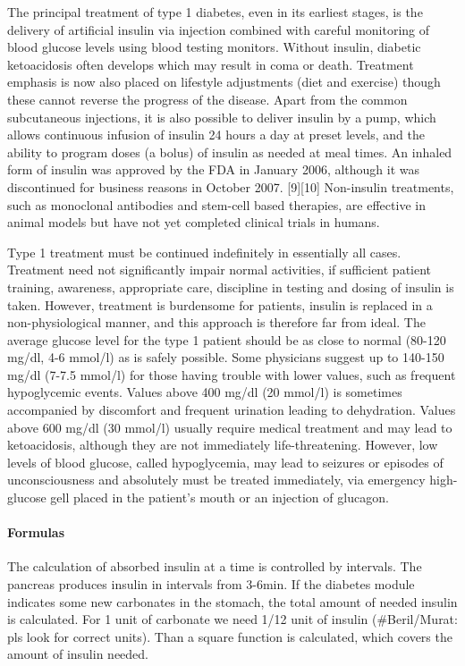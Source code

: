 The principal treatment of type 1 diabetes, even in its earliest stages, is the delivery of artificial insulin via injection combined with careful monitoring of blood glucose levels using blood testing monitors. 
Without insulin, diabetic ketoacidosis often develops which may result in coma or death. Treatment emphasis is now also placed on lifestyle adjustments (diet and exercise) though these cannot reverse the progress of the disease. 
Apart from the common subcutaneous injections, it is also possible to deliver insulin by a pump, which allows continuous infusion of insulin 24 hours a day at preset levels, and the ability to program doses (a bolus) of insulin as needed at meal times. 
An inhaled form of insulin was approved by the FDA in January 2006, although it was discontinued for business reasons in October 2007. [9][10] Non-insulin treatments, such as monoclonal antibodies and stem-cell based therapies, 
are effective in animal models but have not yet completed clinical trials in humans.

Type 1 treatment must be continued indefinitely in essentially all cases. Treatment need not significantly impair normal activities, if sufficient patient training, awareness, appropriate care, discipline in testing and dosing of insulin is taken. 
However, treatment is burdensome for patients, insulin is replaced in a
non-physiological manner, and this approach is therefore far from ideal. The
average glucose level for the type 1 patient should be as close to normal
(80-120 mg/dl, 4-6 mmol/l) as is safely possible. Some physicians suggest up to
140-150 mg/dl (7-7.5 mmol/l) for those having trouble with lower values, such
as frequent hypoglycemic events. Values above 400 mg/dl (20 mmol/l) is
sometimes accompanied by discomfort and frequent urination leading to
dehydration. Values above 600 mg/dl (30 mmol/l) usually require medical
treatment and may lead to ketoacidosis, although they are not immediately
life-threatening. However, low levels of blood glucose, called hypoglycemia,
may lead to seizures or episodes of unconsciousness and absolutely must be
treated immediately, via emergency high-glucose gell placed in the patient's
mouth or an injection of glucagon.

\paragraph{Formulas}
The calculation of absorbed insulin at a time is controlled by intervals. The pancreas produces insulin in intervals from 3-6min.
If the diabetes module indicates some new carbonates in the stomach, the total amount of needed insulin is calculated.
For 1 unit of carbonate we need 1/12 unit of insulin (\#Beril/Murat: pls look
for correct units). Than a square function is calculated, which covers the amount of insulin needed.


